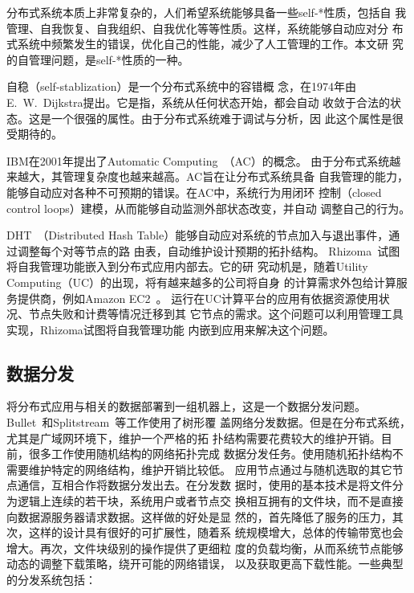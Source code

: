 分布式系统本质上非常复杂的，人们希望系统能够具备一些self-*性质，包括自
我管理、自我恢复、自我组织、自我优化等等性质。这样，系统能够自动应对分
布式系统中频繁发生的错误，优化自己的性能，减少了人工管理的工作。本文研
究的自管理问题，是self-*性质的一种。

自稳\cite{Dijkstra1974}（self-stablization）是一个分布式系统中的容错概
念，在1974年由E.\ W.\ Dijkstra提出。它是指，系统从任何状态开始，都会自动
收敛于合法的状态。这是一个很强的属性。由于分布式系统难于调试与分析，因
此这个属性是很受期待的。

IBM在2001年提出了Automatic Computing~\cite{Kephart2003}（AC）的概念。
由于分布式系统越来越大，其管理复杂度也越来越高。AC旨在让分布式系统具备
自我管理的能力，能够自动应对各种不可预期的错误。在AC中，系统行为用闭环
控制（closed control loops）建模，从而能够自动监测外部状态改变，并自动
调整自己的行为。

DHT~\cite{can, pastry, tapestry, chord, kademlia}（Distributed Hash
Table）能够自动应对系统的节点加入与退出事件，通过调整每个对等节点的路
由表，自动维护设计预期的拓扑结构。
Rhizoma~\cite{Rhizoma}试图将自我管理功能嵌入到分布式应用内部去。它的研
究动机是，随着Utility Computing（UC）的出现，将有越来越多的公司将自身
的计算需求外包给计算服务提供商，例如Amazon EC2~\cite{Garfinkel2007}。
运行在UC计算平台的应用有依据资源使用状况、节点失败和计费等情况迁移到其
它节点的需求。这个问题可以利用管理工具实现，Rhizoma试图将自我管理功能
内嵌到应用来解决这个问题。


\subsection{数据分发}
\label{sec:related:datadistro}

将分布式应用与相关的数据部署到一组机器上，这是一个数据分发问题。
Bullet~\cite{bullet}和Splitstream~\cite{splitstream}等工作使用了树形覆
盖网络分发数据。但是在分布式系统，尤其是广域网环境下，维护一个严格的拓
扑结构需要花费较大的维护开销。目前，很多工作使用随机结构的网络拓扑完成
数据分发任务。使用随机拓扑结构不需要维护特定的网络结构，维护开销比较低。
应用节点通过与随机选取的其它节点通信，互相合作将数据分发出去。在分发数
据时，使用的基本技术是将文件分为逻辑上连续的若干块，系统用户或者节点交
换相互拥有的文件块，而不是直接向数据源服务器请求数据。这样做的好处是显
然的，首先降低了服务的压力，其次，这样的设计具有很好的可扩展性，随着系
统规模增大，总体的传输带宽也会增大。再次，文件块级别的操作提供了更细粒
度的负载均衡，从而系统节点能够动态的调整下载策略，绕开可能的网络错误，
以及获取更高下载性能。一些典型的分发系统包括：

